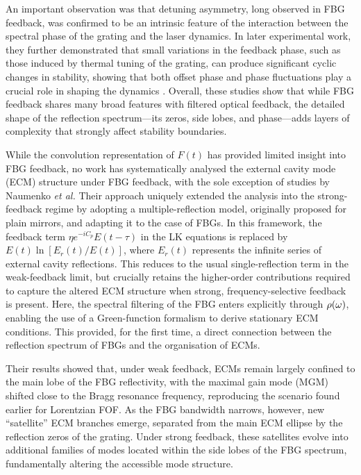 An important observation was that detuning asymmetry, long observed in FBG feedback, was confirmed to be an intrinsic feature of the interaction between the spectral phase of the grating and the laser dynamics.
In later experimental work, they further demonstrated that small variations in the feedback phase, such as those induced by thermal tuning of the grating, can produce significant cyclic changes in stability, showing that both offset phase and phase fluctuations play a crucial role in shaping the dynamics \cite{skenderas2024impact}.
Overall, these studies show that while FBG feedback shares many broad features with filtered optical feedback, the detailed shape of the reflection spectrum—its zeros, side lobes, and phase—adds layers of complexity that strongly affect stability boundaries.
%
\par
%
While the convolution representation of $F(t)$ has provided limited insight into FBG feedback, no work has systematically analysed the external cavity mode (ECM) structure under FBG feedback, with the sole exception of studies by Naumenko \textit{et al.} \cite{naumenko2003characteristics,naumenko2004slow}
Their approach uniquely extended the analysis into the strong-feedback regime by adopting a multiple-reflection model, originally proposed for plain mirrors, and adapting it to the case of FBGs.
In this framework, the feedback term $\eta e^{-i C_p}E(t-\tau)$ in the LK equations is replaced by $E(t)\ln[E_r(t)/E(t)]$, where $E_r(t)$ represents the infinite series of external cavity reflections.
This reduces to the usual single-reflection term in the weak-feedback limit, but crucially retains the higher-order contributions required to capture the altered ECM structure when strong, frequency-selective feedback is present.
Here, the spectral filtering of the FBG enters explicitly through $\rho(\omega)$, enabling the use of a Green-function formalism to derive stationary ECM conditions.
This provided, for the first time, a direct connection between the reflection spectrum of FBGs and the organisation of ECMs.
%
\par
%
Their results showed that, under weak feedback, ECMs remain largely confined to the main lobe of the FBG reflectivity, with the maximal gain mode (MGM) shifted close to the Bragg resonance frequency, reproducing the scenario found earlier for Lorentzian FOF.
As the FBG bandwidth narrows, however, new “satellite” ECM branches emerge, separated from the main ECM ellipse by the reflection zeros of the grating.
Under strong feedback, these satellites evolve into additional families of modes located within the side lobes of the FBG spectrum, fundamentally altering the accessible mode structure.

